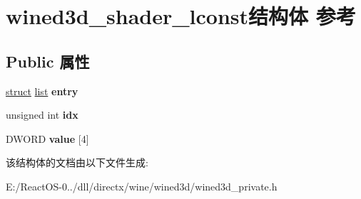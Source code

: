 \hypertarget{structwined3d__shader__lconst}{}\section{wined3d\+\_\+shader\+\_\+lconst结构体 参考}
\label{structwined3d__shader__lconst}
\subsection*{Public 属性}
\begin{DoxyCompactItemize}
\item 
\mbox{\label{structwined3d__shader__lconst_a7021ab8724d23d012bfd5f61cd172395}} 
\hyperlink{interfacestruct}{struct} \hyperlink{classlist}{list} {\bfseries entry}
\item 
\mbox{\label{structwined3d__shader__lconst_a005813b8af44fa3b89ac0f08e84aca91}} 
unsigned int {\bfseries idx}
\item 
\mbox{\label{structwined3d__shader__lconst_a4d5898319e4211bbedf62a093c26d86f}} 
D\+W\+O\+RD {\bfseries value} \mbox{[}4\mbox{]}
\end{DoxyCompactItemize}


该结构体的文档由以下文件生成\+:\begin{DoxyCompactItemize}
\item 
E\+:/\+React\+O\+S-\/0../dll/directx/wine/wined3d/wined3d\+\_\+private.\+h\end{DoxyCompactItemize}
